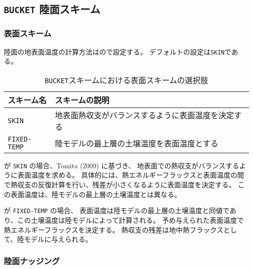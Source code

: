 \subsection{\texttt{BUCKET} 陸面スキーム}
\subsubsection{表面スキーム}

陸面の地表面温度の計算方法はので設定する。
デフォルトの設定は\verb|SKIN|である。
%
\begin{table}[hbt]
\begin{center}
  \caption{\texttt{BUCKET}スキームにおける表面スキームの選択肢}
  \label{tab:nml_land_sfc}
  \begin{tabularx}{150mm}{lX} \hline
    \rowcolor[gray]{0.9}  スキーム名 & スキームの説明 \\ \hline
      \verb|SKIN|       & 地表面熱収支がバランスするように表面温度を決定する \\
      \verb|FIXED-TEMP| & 陸モデルの最上層の土壌温度を表面温度とする \\
    \hline
  \end{tabularx}
\end{center}
\end{table}

 が \verb|SKIN| の場合、Tomita (2009) に基づき、
地表面での熱収支がバランスするように表面温度を求める。
具体的には、熱エネルギーフラックスと表面温度の間で熱収支の反復計算を行い、残差が小さくなるように表面温度を決定する。
この表面温度は、陸モデルの最上層の土壌温度とは異なる。


 が \verb|FIXED-TEMP| の場合、
表面温度は陸モデルの最上層の土壌温度と同値であり、この土壌温度は陸モデルによって計算される。
予め与えられた表面温度で熱エネルギーフラックスを決定する。
熱収支の残差は地中熱フラックスとして、陸モデルに与えられる。


\subsubsection{陸面ナッジング}

